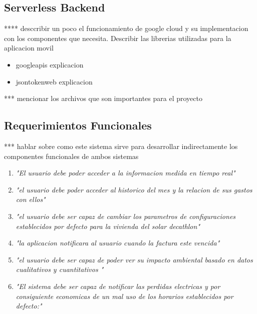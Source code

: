 \subsection{Serverless Backend}

**** desccribir un poco el funcionamiento de google cloud  y su implementacion con los componentes que necesita. Describir las librerias utilizadas para la aplicacion movil

\begin{itemize}
	
	\item googleapis explicacion
	
	\item jsontokenweb	explicacion
	
\end{itemize}

*** mencionar los archivos que son importantes para el proyecto


\subsection{Requerimientos Funcionales}

*** hablar sobre como este sistema sirve para desarrollar indirectamente los componentes funcionales de ambos sistemas


\begin{enumerate}
	\item \textsl{"El usuario debe poder acceder a la informacion medida en tiempo real"} 
	
	\item \textsl{"el usuario debe poder acceder al historico del mes y la relacion de sus gastos con ellos"} 	
	
	\item  \textsl{"el usuario debe ser capaz de cambiar los parametros de configuraciones establecidos por defecto para la vivienda del solar decathlon"}
	
	\item  \textsl{"la aplicacion notificara al usuario cuando la factura este vencida"}
	
	\item \textsl{"el usuario debe ser capaz de poder ver su impacto ambiental basado en datos cualitativos y cuantitativos "}
	
	\item \textsl{"El sistema debe ser capaz de notificar las perdidas electricas y por consiguiente economicas de un mal uso de los horarios establecidos por defecto:"}
\end{enumerate}


